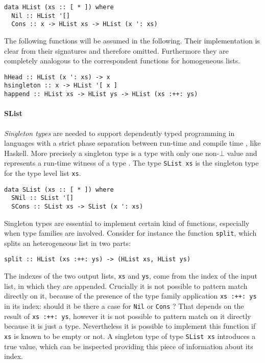 \documentclass[../Thesis.tex]{subfiles}
\begin{document}
\begin{verbatim}
data HList (xs :: [ * ]) where
  Nil :: HList '[] 
  Cons :: x -> HList xs -> HList (x ': xs) 
\end{verbatim}

	The following functions will be assumed in the following.
	Their implementation is clear from their
	signatures and therefore omitted. 
	Furthermore they are completely analogous to 
	the correspondent functions for homogeneous lists.
	
\begin{verbatim}
hHead :: HList (x ': xs) -> x
hsingleton :: x -> HList '[ x ]
happend :: HList xs -> HList ys -> HList (xs :++: ys)
\end{verbatim}

	\paragraph{SList}
	\label{par:SList}
	\emph{Singleton types} are needed to support dependently 
	typed programming in languages with a strict phase separation
	between run-time and compile time \cite{Eisenberg12DTPS}, like Haskell.
	More precisely a singleton type is a type with only one non-$\bot$ value 
	and represents a run-time witness of a type \cite{Eisenberg12DTPS}.
	The type \texttt{SList xs} is the singleton type for the type level list 
	\texttt{xs}.
	
\begin{verbatim}
data SList (xs :: [ * ]) where
  SNil :: SList '[]
  SCons :: SList xs -> SList (x ': xs)
\end{verbatim}

	Singleton types are essential to implement certain kind of functions,
	especially when type families are involved.
	Consider for instance the function \texttt{split}, which
	splits an heterogeneous list in two parts:
\begin{verbatim}
split :: HList (xs :++: ys) -> (HList xs, HList ys)
\end{verbatim}

	The indexes of the two output lists, \texttt{xs} and \texttt{ys},
	come from the index of the input list, in which they are appended.
	Crucially it is not possible to pattern match directly on it, because
	of the presence of the type family application \texttt{xs :++: ys} in
	its index:
	should it be 	there a case for \texttt{Nil} or \texttt{Cons} ?
	That depends on the result of \texttt{xs :++: ys}, 
	however it is not possible to pattern match on it 
	directly because it is just a type.
	Nevertheless it is possible to implement this function if \texttt{xs}
	is known to be empty or not.
	A singleton type of type \texttt{SList xs}
	introduces a true value, which can be inspected 
	providing this piece of information about its index.
	
\end{document}
